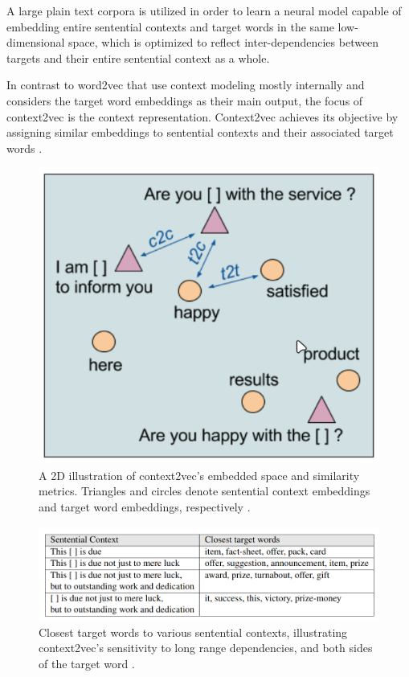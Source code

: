             A large plain text corpora is utilized in order to learn a neural model capable of embedding  entire  sentential  contexts  and  target words in the same low-dimensional space, which is optimized to reflect inter-dependencies between targets and their entire sentential context as a whole. 
            
            
            In contrast to word2vec that use context modeling mostly internally and considers the target word embeddings as their main output, the focus of context2vec is the context representation. Context2vec achieves its objective by assigning similar embeddings to sentential contexts and their associated target words \cite{Melamud2016}.

            \begin{figure}[htb]
                \centering
                \includegraphics[scale = 0.35]{Sections/3StateOfTheArt/3_images/context2vec_embedding.png}
                \caption{A 2D illustration of context2vec’s embedded space and similarity metrics. Triangles and circles denote sentential context embeddings and target word embeddings, respectively \cite{Melamud2016}.} 
            \end{figure}

            \begin{figure}[htb]
                \centering
                \includegraphics[scale = 0.35]{Sections/3StateOfTheArt/3_images/context2vec_predict.png}
                \caption{Closest target words to various sentential contexts, illustrating context2vec’s sensitivity to long range dependencies, and both sides of the target word \cite{Melamud2016}.} 
            \end{figure}
            
